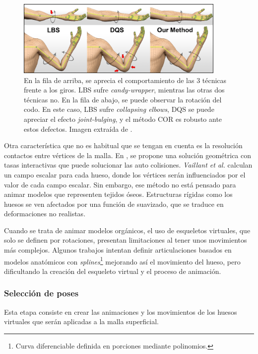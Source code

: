 \begin{figure}[ht]%
  \centering
  \includegraphics[width=0.90\textwidth]{IMG/corexample.png}
    \caption{En la fila de arriba, se aprecia el comportamiento de las 3 técnicas frente a los giros. \acs{LBS} sufre \emph{candy-wrapper}, mientras las otras dos técnicas no. En la fila de abajo, se puede observar la rotación del codo. En este caso, \acs{LBS} sufre \emph{collapsing elbows}, \acs{DQS} se puede apreciar el efecto \emph{joint-bulging}, y el método \acs{COR} es robusto ante estos defectos. Imagen extraída de \cite{le2016real}. }
    \label{fig:corexample}
\end{figure}
%
%
Otra característica que no es habitual que se tengan en cuenta es la resolución contactos entre vértices de la malla. En \cite{Vaillant:2014}, se propone una solución geométrica con tasas interactivas que puede solucionar las auto colisiones. \emph{Vaillant et al.} calculan un campo escalar para cada hueso, donde los vértices serán influenciados por el valor de cada campo escalar. Sin embargo, ese método no está pensado para animar modelos que representen tejidos óseos. Estructuras rígidas como los huesos se ven afectados por una función de suavizado, que se traduce en deformaciones no realistas. %

Cuando se trata de animar modelos orgánicos, el uso de esqueletos virtuales, que solo se definen por rotaciones, presentan limitaciones al tener unos movimientos más complejos. Algunos trabajos intentan definir articulaciones basados en modelos anatómicos \cite{joints} con \emph{splines}\footnote{Curva diferenciable definida en porciones mediante polinomios.} mejorando así el movimiento del hueso, pero dificultando la creación del esqueleto virtual y el proceso de animación.

\subsubsection{Selección de poses} 
\label{art:poses}
Esta etapa consiste en crear las animaciones  y los movimientos de los huesos virtuales que serán aplicadas a la malla superficial.   

